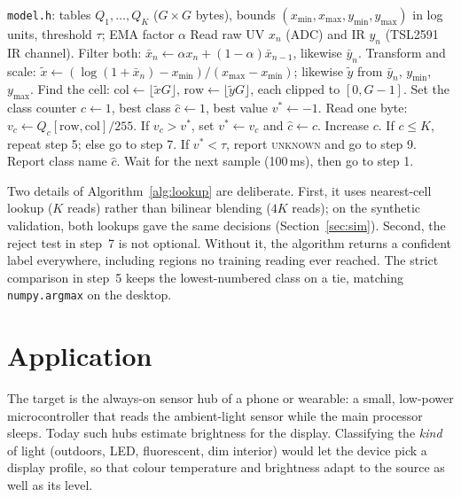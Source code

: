 \documentclass[conference]{IEEEtran}
\begin{document}
\begin{algorithm}[!bt]
\caption{ESP32 inference loop (online path).}
\label{alg:lookup}
\begin{algorithmic}[1]
\Require \texttt{model.h}: tables $Q_1,\dots,Q_K$ ($G\times G$ bytes), bounds $(x_{\min},x_{\max},y_{\min},y_{\max})$ in log units, threshold $\tau$; EMA factor $\alpha$
\State Read raw UV $x_n$ (ADC) and IR $y_n$ (TSL2591 IR channel). Filter both: $\bar{x}_n \gets \alpha x_n + (1-\alpha)\bar{x}_{n-1}$, likewise $\bar{y}_n$.
\State Transform and scale: $\tilde{x} \gets (\log(1+\bar{x}_n) - x_{\min})/(x_{\max}-x_{\min})$; likewise $\tilde{y}$ from $\bar{y}_n$, $y_{\min}$, $y_{\max}$.
\State Find the cell: $\text{col} \gets \lfloor \tilde{x}G \rfloor$, $\text{row} \gets \lfloor \tilde{y}G \rfloor$, each clipped to $[0, G-1]$.
\State Set the class counter $c \gets 1$, best class $\hat{c} \gets 1$, best value $v^{*} \gets -1$.
\State Read one byte: $v_c \gets Q_c[\text{row},\text{col}]/255$. If $v_c > v^{*}$, set $v^{*} \gets v_c$ and $\hat{c} \gets c$.
\State Increase $c$. If $c \le K$, repeat step 5; else go to step 7.
\State If $v^{*} < \tau$, report \textsc{unknown} and go to step 9.
\State Report class name $\hat{c}$.
\State Wait for the next sample (100\,ms), then go to step 1.
\end{algorithmic}
\end{algorithm}

Two details of Algorithm~\ref{alg:lookup} are deliberate. First, it uses nearest-cell lookup ($K$ reads) rather than bilinear blending ($4K$ reads); on the synthetic validation, both lookups gave the same decisions (Section~\ref{sec:sim}). Second, the reject test in step~7 is not optional. Without it, the algorithm returns a confident label everywhere, including regions no training reading ever reached. The strict comparison in step~5 keeps the lowest-numbered class on a tie, matching \texttt{numpy.argmax} on the desktop.

\section{Application}

The target is the always-on sensor hub of a phone or wearable: a small, low-power microcontroller that reads the ambient-light sensor while the main processor sleeps. Today such hubs estimate brightness for the display. Classifying the \emph{kind} of light (outdoors, LED, fluorescent, dim interior) would let the device pick a display profile, so that colour temperature and brightness adapt to the source as well as its level.
\end{document}
